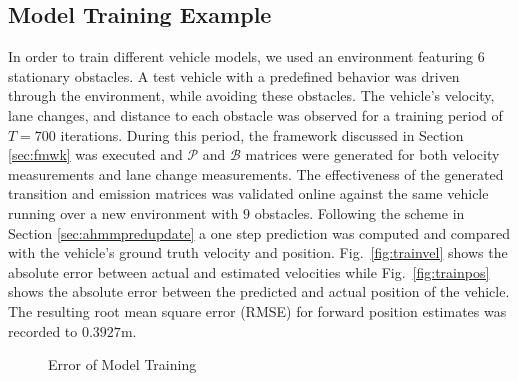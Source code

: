 \documentclass[letterpaper, 10 pt, conference]{ieeeconf}  %
\begin{document}
\vspace{-5pt}
\subsection{Model Training Example}
In order to train different vehicle models, we used an environment featuring $6$ stationary obstacles. A test vehicle with a predefined behavior was driven through the environment, while avoiding these obstacles. The vehicle's velocity, lane changes, and distance to each obstacle was observed for a training period of $T=700$ iterations. During this period, the framework discussed in Section \ref{sec:fmwk} was executed and $\mathcal P$ and $\mathcal B$ matrices were generated for both velocity measurements and lane change measurements. The effectiveness of the generated transition and emission matrices was validated online against the same vehicle running over a new environment with $9$ obstacles. Following the scheme in Section \ref{sec:ahmmpredupdate} a one step prediction was computed and compared with the vehicle's ground truth velocity and position.
Fig.~\ref{fig:trainvel} shows the absolute error between actual and estimated velocities while Fig.~\ref{fig:trainpos} shows the absolute error between the predicted and actual position of the vehicle. The resulting root mean square error (RMSE) for forward position estimates was recorded to $0.3927$m.

\begin{figure}[ht!]
	\centering
	\vspace{-10pt}
	\caption{Error of Model Training}
	\label{fig:trainerrors}
	\vspace{-10pt}
\end{figure}
\end{document}
